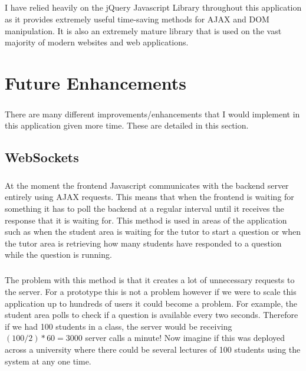 \documentclass[10pt]{report}
\begin{document}
    \paragraph{}
    I have relied heavily on the jQuery Javascript Library throughout this application as it provides
    extremely useful time-saving methods for AJAX and DOM manipulation.  It is also an extremely mature
    library that is used on the vast majority of modern websites and web applications.
    
    \chapter*{Future Enhancements}
    \paragraph{}
    There are many different improvements/enhancements that I would implement in this application given
    more time.  These are detailed in this section.
    
    \section*{WebSockets}
    \paragraph{}
    At the moment the frontend Javascript communicates with the backend server entirely using AJAX
    requests.  This means that when the frontend is waiting for something it has to poll the backend at a
    regular interval until it receives the response that it is waiting for. This method is used in areas
    of the application such as when the student area is waiting for the tutor to start a question or when
    the tutor area is retrieving how many students have responded to a question while the question is
    running.
    
    \paragraph{}
    The problem with this method is that it creates a lot of unnecessary requests to the server.  For a
    prototype this is not a problem however if we were to scale this application up to hundreds of users
    it could become a problem.  For example, the student area polls to check if a question is available
    every two seconds.  Therefore if we had 100 students in a class, the server would be receiving
    $(100/2)*60=3000$ server calls a minute!  Now imagine if this was deployed across a university where
    there could be several lectures of 100 students using the system at any one time.
    
\end{document}
